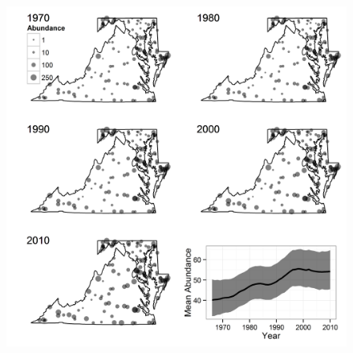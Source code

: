 \documentclass[12pt,english]{article}
\begin{document}
\begin{spacing}{1.9}
\begin{flushleft}
\begin{figure}
\caption{}
  \centering
  \includegraphics[width=6.6in]{figs/OVEN_N_by_route_year6}
\label{fig:oven_N}
\end{figure}
\end{flushleft}
\end{spacing}
\end{document}
